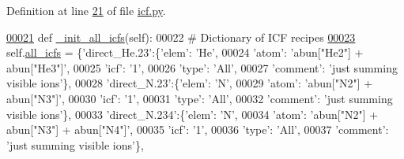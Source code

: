 Definition at line \hyperlink{icf_8py_source_l00021}{21} of file \hyperlink{icf_8py_source}{icf.\+py}.


\begin{DoxyCode}
\hypertarget{classpyneb_1_1core_1_1icf_1_1_i_c_f_l00021}{}\hyperlink{classpyneb_1_1core_1_1icf_1_1_i_c_f_a109ccae36899c07ffd166b85fd3c0eb4}{00021}     \textcolor{keyword}{def }\hyperlink{classpyneb_1_1core_1_1icf_1_1_i_c_f_a109ccae36899c07ffd166b85fd3c0eb4}{\_init\_all\_icfs}(self):
00022         \textcolor{comment}{# Dictionary of ICF recipes}
\hypertarget{classpyneb_1_1core_1_1icf_1_1_i_c_f_l00023}{}\hyperlink{classpyneb_1_1core_1_1icf_1_1_i_c_f_a854ee87a53feb102e429e902227ce88b}{00023}         self.\hyperlink{classpyneb_1_1core_1_1icf_1_1_i_c_f_a854ee87a53feb102e429e902227ce88b}{all\_icfs} = \{\textcolor{stringliteral}{'direct\_He.23'}:\{\textcolor{stringliteral}{'elem'}: \textcolor{stringliteral}{'He'},
00024                                        \textcolor{stringliteral}{'atom'}: \textcolor{stringliteral}{'abun["He2"] + abun["He3"]'},
00025                                        \textcolor{stringliteral}{'icf'}: \textcolor{stringliteral}{'1'},
00026                                        \textcolor{stringliteral}{'type'}: \textcolor{stringliteral}{'All'},
00027                                        \textcolor{stringliteral}{'comment'}: \textcolor{stringliteral}{'just summing visible ions'}\},
00028                          \textcolor{stringliteral}{'direct\_N.23'}:\{\textcolor{stringliteral}{'elem'}: \textcolor{stringliteral}{'N'},
00029                                        \textcolor{stringliteral}{'atom'}: \textcolor{stringliteral}{'abun["N2"] + abun["N3"]'},
00030                                        \textcolor{stringliteral}{'icf'}: \textcolor{stringliteral}{'1'},
00031                                        \textcolor{stringliteral}{'type'}: \textcolor{stringliteral}{'All'},
00032                                        \textcolor{stringliteral}{'comment'}: \textcolor{stringliteral}{'just summing visible ions'}\},
00033                          \textcolor{stringliteral}{'direct\_N.234'}:\{\textcolor{stringliteral}{'elem'}: \textcolor{stringliteral}{'N'},
00034                                        \textcolor{stringliteral}{'atom'}: \textcolor{stringliteral}{'abun["N2"] + abun["N3"] + abun["N4"]'},
00035                                        \textcolor{stringliteral}{'icf'}: \textcolor{stringliteral}{'1'},
00036                                        \textcolor{stringliteral}{'type'}: \textcolor{stringliteral}{'All'},
00037                                        \textcolor{stringliteral}{'comment'}: \textcolor{stringliteral}{'just summing visible ions'}\},

\end{DoxyCode}
